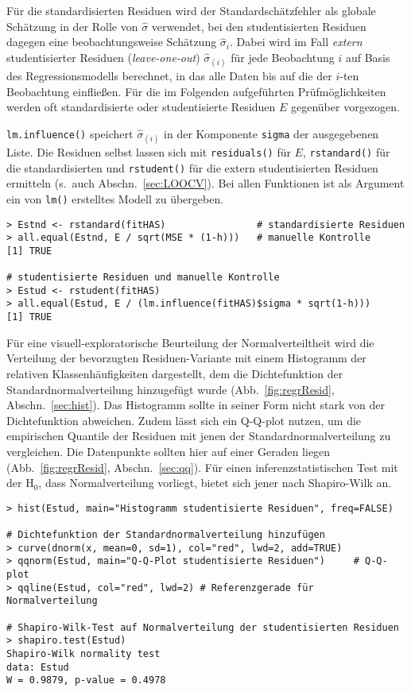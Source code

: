 Für die standardisierten Residuen wird der Standardschätzfehler als globale Schätzung in der Rolle von $\hat{\sigma}$ verwendet, bei den studentisierten Residuen dagegen eine beobachtungsweise Schätzung $\hat{\sigma}_{i}$. Dabei wird im Fall \emph{extern} studentisierter Residuen (\emph{leave-one-out}) $\hat{\sigma}_{(i)}$ für jede Beobachtung $i$ auf Basis des Regressionsmodells berechnet, in das alle Daten bis auf die der $i$-ten Beobachtung einfließen. Für die im Folgenden aufgeführten Prüfmöglichkeiten werden oft standardisierte oder studentisierte Residuen $E$ gegenüber vorgezogen.

\lstinline!lm.influence()! speichert $\hat{\sigma}_{(i)}$ in der Komponente \lstinline!sigma! der ausgegebenen Liste. Die Residuen selbst lassen sich mit \lstinline!residuals()! für $E$, \lstinline!rstandard()! für die standardisierten und \lstinline!rstudent()! für die extern studentisierten Residuen ermitteln (s.\ auch Abschn.\ \ref{sec:LOOCV}). Bei allen Funktionen ist als Argument ein von \lstinline!lm()! erstelltes Modell zu übergeben.
\begin{lstlisting}
> Estnd <- rstandard(fitHAS)                # standardisierte Residuen
> all.equal(Estnd, E / sqrt(MSE * (1-h)))   # manuelle Kontrolle
[1] TRUE

# studentisierte Residuen und manuelle Kontrolle
> Estud <- rstudent(fitHAS)
> all.equal(Estud, E / (lm.influence(fitHAS)$sigma * sqrt(1-h)))
[1] TRUE
\end{lstlisting}

Für eine visuell-exploratorische Beurteilung der Normalverteiltheit wird die Verteilung der bevorzugten Residuen-Variante mit einem Histogramm der relativen Klassenhäufigkeiten dargestellt, dem die Dichtefunktion der Standardnormalverteilung hinzugefügt wurde (Abb.\ \ref{fig:regrResid}, Abschn.\ \ref{sec:hist}). Das Histogramm sollte in seiner Form nicht stark von der Dichtefunktion abweichen. Zudem lässt sich ein Q-Q-plot nutzen, um die empirischen Quantile der Residuen mit jenen der Standardnormalverteilung zu vergleichen. Die Datenpunkte sollten hier auf einer Geraden liegen (Abb.\ \ref{fig:regrResid}, Abschn.\ \ref{sec:qq}). Für einen inferenzstatistischen Test mit der $\text{H}_{0}$, dass Normalverteilung vorliegt, bietet sich jener nach Shapiro-Wilk an.
\begin{lstlisting}
> hist(Estud, main="Histogramm studentisierte Residuen", freq=FALSE)

# Dichtefunktion der Standardnormalverteilung hinzufügen
> curve(dnorm(x, mean=0, sd=1), col="red", lwd=2, add=TRUE)
> qqnorm(Estud, main="Q-Q-Plot studentisierte Residuen")     # Q-Q-plot
> qqline(Estud, col="red", lwd=2) # Referenzgerade für Normalverteilung

# Shapiro-Wilk-Test auf Normalverteilung der studentisierten Residuen
> shapiro.test(Estud)
Shapiro-Wilk normality test
data: Estud
W = 0.9879, p-value = 0.4978
\end{lstlisting}

